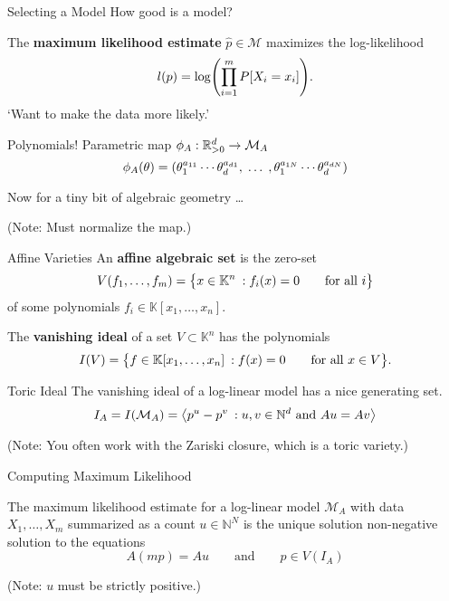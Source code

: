 \documentclass[xcolor=dvipsnames]{beamer}
\newcommand*{\as}{A}
\newcommand*{\ms}{\mathcal M}
\begin{document}
\begin{frame}{Selecting a Model}
    How good is a model?

    \lspace
    The \textbf{maximum likelihood estimate} $\hat p \in \ms$
    maximizes the log-likelihood
    \[
        l(p) = \log \pdel*{\prod_{i=1}^m P[X_i = x_i]}.
    \]
    `Want to make the data more likely.'
\end{frame}

\begin{frame}{Polynomials!}
    Parametric map $\phi_A: \R_{>0}^d \to \ms_A$
    \[
        \phi_\as(\theta) = 
        \pdel*{
            \theta_1^{a_{11}} \cdots
            \theta_d^{a_{d1}}
            ,\;\ldots\;,
            \theta_1^{a_{1N}} \cdots
            \theta_d^{a_{dN}}
        }
    \]

    \lspace 
    Now for a tiny bit of algebraic geometry \ldots

    \lspace
    \lspace
    {\footnotesize
        (Note: Must normalize the map.)
    }
\end{frame}

\begin{frame}{Affine Varieties}
    An \textbf{affine algebraic set} is the zero-set
    \[
        V(f_1, \ldots, f_m) = 
        \cdel[\big]{
        x \in \mathbb K^n \::
        f_i(x) = 0 \qquad
        \text{for all $i$}
        }
    \]
    of some polynomials $f_i \in \mathbb K[x_1, \ldots, x_n]$.

    \lspace
    \lspace
    The \textbf{vanishing ideal} of a set $V \subset \mathbb K^n$ has
    the polynomials
    \[
        I(V) = \cdel[\big]{f \in \mathbb K[x_1, \ldots, x_n] \::
        f(x) = 0 \qquad
        \text{for all $x \in V$}}.
    \]
\end{frame}

\begin{frame}{Toric Ideal}
    The vanishing ideal of a log-linear model has a nice generating set.
    \[
        I_\as = I(\ms_\as) = \adel[\big]{
            p^u - p^v \::
            \text{$u, v \in \mathbb N^d$ and $\as u = \as v$}
        }
    \]

    \lspace
    \lspace
    \lspace
    {\footnotesize
        (Note: You often work with the Zariski closure, which is a toric
        variety.)
    }
\end{frame}

\begin{frame}{Computing Maximum Likelihood}
    \begin{theorem}
        The maximum likelihood estimate for a log-linear model $\ms_\as$ with
        data $X_1, \ldots, X_m$ summarized as a count $u \in \mathbb{N}^N$ is
        the unique solution non-negative solution to the equations
        \[
            \as (mp) = \as u
            \qquad\text{and}\qquad
            p \in V(I_\as)
        \]
    \end{theorem}

    \lspace
    \lspace
    {\footnotesize
        (Note: $u$ must be strictly positive.)
    }
\end{frame}
\end{document}
